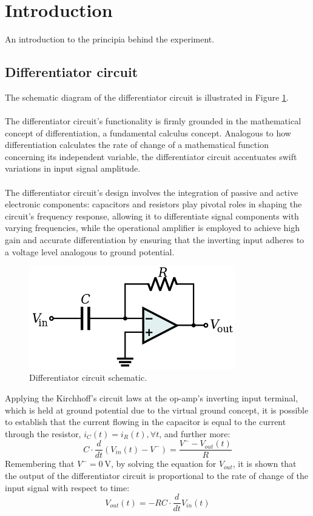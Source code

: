 \section{Introduction}
An introduction to the principia behind the experiment.

	\subsection{Differentiator circuit}
		The schematic diagram of the differentiator circuit is illustrated in Figure \ref{fig:differentiator_circuit}. \\\\
		The differentiator circuit's functionality is firmly grounded in the mathematical concept of differentiation, a fundamental calculus concept.
		Analogous to how differentiation calculates the rate of change of a mathematical function concerning its independent variable, 
		the differentiator circuit accentuates swift variations in input signal amplitude. \\\\
		The differentiator circuit's design involves the integration of passive and active electronic components:
		capacitors and resistors play pivotal roles in shaping the circuit's frequency response, allowing it to differentiate signal components with varying frequencies, 
		while the operational amplifier is employed to achieve high gain and accurate differentiation by ensuring that the inverting input adheres to a voltage level analogous to ground potential. \\
		\begin{figure}[H]
		    \centering
		    \includegraphics[width=0.8\textwidth]{figures/differentiator/circuit.png}
		    \caption{Differentiator circuit schematic.}
		    \label{fig:differentiator_circuit}
		\end{figure}
		\noindent 
		Applying the Kirchhoff's circuit laws at the op-amp's inverting input terminal, which is held at ground potential due to the virtual ground concept, 
		it is possible to establish that the current flowing in the capacitor is equal to the current through the resistor, $i_C(t) = i_R(t), \forall t$, and further more: 
		$$ C \cdot \frac{d}{dt}(V_{in}(t) - V^-) = \frac{V^- - V_{out}(t)}{R} $$
		Remembering that $V^- = \SI{0}{\volt}$, by solving the equation for $V_{out}$, 
		it is shown that the output of the differentiator circuit is proportional to the rate of change of the input signal with respect to time: $$ V_{out}(t) = - RC \cdot \frac{d}{dt}V_{in}(t) $$
		
